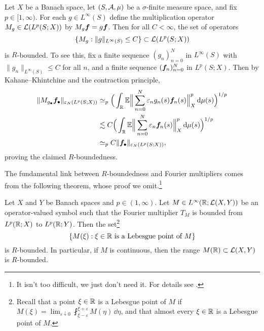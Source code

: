 \begin{example}\label{eg:R-bounded-multipliers}
  Let $X$ be a Banach space, let $(S,\mathcal{A},\mu)$ be a $\sigma$-finite measure space, and fix $p \in [1,\infty)$.
  For each $g \in L^\infty(S)$ define the multiplication operator $M_{g} \in \mathcal{L}(L^p(S;X))$ by $M_{g}\bm{f} = g\bm{f}$.
  Then for all $C < \infty$, the set of operators
  \begin{equation*}
    \{M_{g}  : \|g\|_{L^\infty(S)} \leq C\} \subset \mathcal{L}(L^{p}(S;X))
  \end{equation*}
  is $R$-bounded.
  To see this, fix a finite sequence $(g_{n})_{n=0}^{N}$ in $L^\infty(S)$ with $\|g_{n}\|_{L^\infty(S)} \leq C$ for all $n$, and a finite sequence $(\bm{f}_{n})_{n=0}^{N}$ in $L^p(S;X)$.
  Then by Kahane--Khintchine and the contraction principle,
  \begin{equation*}
    \begin{aligned}
      \| M_{g_{\bullet}} \bm{f}_{\bullet} \|_{\varepsilon_{N}(L^p(S;X))}
      &\simeq_{p} \Big( \int_{\mathbb{R}} \mathbb{E} \Big\| \sum_{n=0}^{N} \varepsilon_{n} g_{n}(s) \bm{f}_{n}(s) \Big\|_{X}^{p} \, \mathrm{d}\mu(s) \Big)^{1/p} \\
      &\lesssim C \Big( \int_{\mathbb{R}} \mathbb{E} \Big\| \sum_{n=0}^{N} \varepsilon_{n} \bm{f}_{n}(s) \Big\|_{X}^{p} \, \mathrm{d}\mu(s) \Big)^{1/p} \\
      &\simeq_{p} C \| \bm{f}_{\bullet} \|_{\varepsilon_{N}(L^p(S;X))},
    \end{aligned}
  \end{equation*}
  proving the claimed $R$-boundedness.
\end{example}

The fundamental link between $R$-boundedness and Fourier multipliers comes from the following theorem, whose proof we omit.\footnote{It isn't too difficult, we just don't need it. For details see \cite[Theorem 5.3.15]{HNVW16}.}

\begin{thm}
  Let $X$ and $Y$ be Banach spaces and $p \in (1,\infty)$.
  Let $M \in L^\infty(\mathbb{R};\mathcal{L}(X,Y))$ be an operator-valued symbol such that the Fourier multiplier $T_{M}$ is bounded from $L^p(\mathbb{R};X)$ to $L^p(\mathbb{R};Y)$.
  Then the set\footnote{Recall that a point $\xi \in \mathbb{R}$ is a Lebesgue point of $M$ if $M(\xi) = \lim_{\varepsilon \downarrow 0} \fint_{\xi-\varepsilon}^{\xi+\varepsilon} M(\eta) \, \dd\eta $, and that almost every $\xi \in \mathbb{R}$ is a Lebesgue point of $M$.}
  \begin{equation*}
    \{M(\xi) : \text{$\xi \in \mathbb{R}$ is a Lebesgue point of $M$}\}
  \end{equation*}
  is $R$-bounded.
  In particular, if $M$ is continuous, then the range $M(\mathbb{R}) \subset \mathcal{L}(X,Y)$ is $R$-bounded.
\end{thm}

